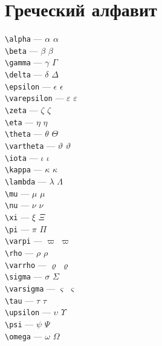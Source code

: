 \documentclass[a4paper, 12 pt]{article}
\begin{document}
\section*{Греческий алфавит}
\begin{flushleft}
	\verb|\alpha|      --- $\alpha$      $\alpha$      \\
	\verb|\beta|       --- $\beta$       $\beta$       \\
	\verb|\gamma|      --- $\gamma$      $\Gamma$      \\
	\verb|\delta|      --- $\delta$      $\Delta$      \\
	\verb|\epsilon|    --- $\epsilon$    $\epsilon$    \\
	\verb|\varepsilon| --- $\varepsilon$ $\varepsilon$ \\
	\verb|\zeta|       --- $\zeta$       $\zeta$       \\
	\verb|\eta|        --- $\eta$        $\eta$        \\
	\verb|\theta|      --- $\theta$      $\Theta$      \\
	\verb|\vartheta|   --- $\vartheta$   $\vartheta$   \\
	\verb|\iota|       --- $\iota$       $\iota$       \\
	\verb|\kappa|      --- $\kappa$      $\kappa$      \\
	\verb|\lambda|     --- $\lambda$     $\Lambda$     \\
	\verb|\mu|         --- $\mu$         $\mu$         \\
	\verb|\nu|         --- $\nu$         $\nu$         \\
	\verb|\xi|         --- $\xi$         $\Xi$         \\
	\verb|\pi|         --- $\pi$         $\Pi$         \\
	\verb|\varpi|      --- $\varpi$      $\varpi$      \\
	\verb|\rho|        --- $\rho$        $\rho$        \\
	\verb|\varrho|     --- $\varrho$     $\varrho$     \\
	\verb|\sigma|      --- $\sigma$      $\Sigma$      \\
	\verb|\varsigma|   --- $\varsigma$   $\varsigma$   \\
	\verb|\tau|        --- $\tau$        $\tau$        \\
	\verb|\upsilon|    --- $\upsilon$    $\Upsilon$    \\
	\verb|\psi|        --- $\psi$        $\Psi$        \\
	\verb|\omega|      --- $\omega$      $\Omega$      \\
\end{flushleft}
\end{document}
